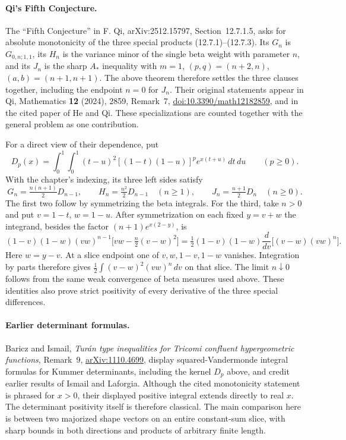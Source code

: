 \documentclass[11pt,a4paper]{article}
\numberwithin{equation}{section}
\begin{document}
\paragraph{Qi's Fifth Conjecture.}
The ``Fifth Conjecture'' in F. Qi, arXiv:2512.15797,
Section~12.7.1.5, asks for absolute monotonicity of the three special
products (12.7.1)--(12.7.3). Its $G_n$ is $G_{0,n;1,1}$, its $H_n$
is the variance minor of the single beta weight with parameter $n$,
and its $J_n$ is the sharp $A_*$ inequality with $m=1$,
$(p,q)=(n+2,n)$, $(a,b)=(n+1,n+1)$. The above theorem therefore
settles the three clauses together, including the endpoint $n=0$
for $J_n$. Their original statements appear in Qi, Mathematics
\textbf{12} (2024), 2859, Remark~7,
\href{https://doi.org/10.3390/math12182859}{doi:10.3390/math12182859},
and in the cited paper of He and Qi. These specializations are
counted together with the general problem as one contribution.

For a direct view of their dependence, put
\[
 D_p(x)=\int_0^1\!\int_0^1 (t-u)^2[(1-t)(1-u)]^p e^{x(t+u)}\,dt\,du
 \qquad(p\ge0).
\]
With the chapter's indexing, its three left sides satisfy
\[
 G_n=\tfrac{n(n+1)}2 D_{n-1},\qquad
 H_n=\tfrac{n^2}2 D_{n-1}\quad(n\ge1),\qquad
 J_n=\tfrac{n+1}2D_n\quad(n\ge0).
\]
The first two follow by symmetrizing the beta integrals. For the
third, take $n>0$ and put $v=1-t$, $w=1-u$. After symmetrization
on each fixed $y=v+w$ the integrand, besides the factor
$(n+1)e^{x(2-y)}$, is
\[
 (1-v)(1-w)(vw)^{n-1}
       \bigl[vw-\tfrac n2(v-w)^2\bigr]
 =\tfrac12(1-v)(1-w)\frac{d}{dv}\bigl[(v-w)(vw)^n\bigr].
\]
Here $w=y-v$. At a slice endpoint one of $v,w,1-v,1-w$ vanishes.
Integration by parts therefore gives
$\frac12\int(v-w)^2(vw)^n\,dv$ on that slice.
The limit $n\downarrow0$ follows from the same weak convergence of
beta measures used above. These identities also prove strict
positivity of every derivative of the three special differences.

\paragraph{Earlier determinant formulas.}
Baricz and Ismail, \emph{Tur\'an type inequalities for Tricomi
confluent hypergeometric functions}, Remark~9,
\href{https://arxiv.org/abs/1110.4699}{arXiv:1110.4699}, display
squared-Vandermonde integral formulas for Kummer determinants, including
the kernel $D_p$ above, and credit earlier results of Ismail and
Laforgia. Although the cited monotonicity statement is phrased for
$x>0$, their displayed positive integral extends directly to real $x$.
The determinant positivity itself is therefore classical. The main
comparison here is between two majorized shape vectors on an entire
constant-sum slice, with sharp bounds in both directions and products
of arbitrary finite length.
\end{document}

